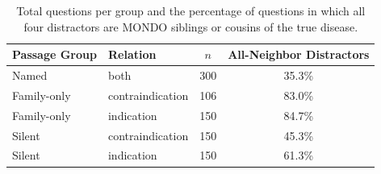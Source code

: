 \begin{table}[h]
\centering
\small
\begin{tabular}{llcc}
\toprule
Passage Group & Relation & $n$ & All-Neighbor Distractors \\
\midrule
Named & both & 300 & 35.3\% \\
Family-only & contraindication & 106 & 83.0\% \\
Family-only & indication & 150 & 84.7\% \\
Silent & contraindication & 150 & 45.3\% \\
Silent & indication & 150 & 61.3\% \\
\bottomrule
\end{tabular}
\caption{Total questions per group and the percentage of questions in which all four distractors are MONDO siblings or cousins of the true disease.}
\label{tab:sib}
\end{table}